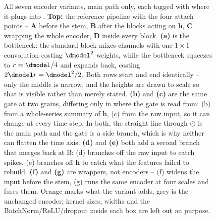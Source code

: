 \begin{figure}[htbp]
  \centering
  
  \caption{All seven encoder variants, main path only, each tagged with where it plugs into
  . \textbf{Top:} the reference pipeline with the four attach points --
  \textbf{A} before the stem, \textbf{B} after the blocks acting on $\mathbf{h}$, \textbf{C} wrapping
  the whole encoder, \textbf{D} inside every block. \textbf{(a)} is the bottleneck: the standard
  block mixes channels with one $1\times1$ convolution costing $\dmodel^2$ weights, while the
  bottleneck squeezes to $r = \dmodel/4$ and expands back, costing $2\dmodel r = \dmodel^2/2$. Both
  rows start and end identically -- only the middle is narrow, and the heights are drawn to scale so
  that is visible rather than merely stated. \textbf{(b)} and \textbf{(c)} are the same gate at two
  grains, differing only in where the gate is read from: (b) from a whole-series summary of
  $\mathbf{h}$, (c) from the raw input, so it can change at every time step. In both, the straight
  line through $\odot$ is the main path and the gate is a side branch, which is why neither can
  flatten the time axis. \textbf{(d)} and \textbf{(e)} both add a second branch that merges back at
  B: (d) branches off the raw input to catch spikes, (e) branches off $\mathbf{h}$ to catch what the
  features failed to rebuild. \textbf{(f)} and \textbf{(g)} are wrappers, not encoders -- (f) widens
  the input before the stem, (g) runs the same encoder at four scales and fuses them. Orange marks
  what the variant adds, grey is the unchanged encoder; kernel sizes, widths and the
  BatchNorm/ReLU/dropout inside each box are left out on purpose.}
  \label{fig:variants}
\end{figure}

